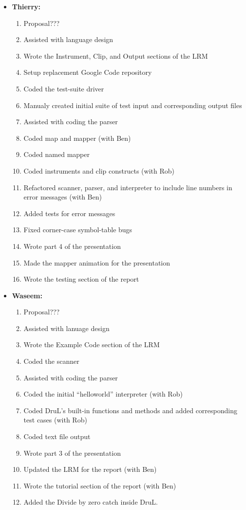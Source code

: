 \begin{itemize}
\item \textbf{Thierry:}
\begin{enumerate}
	\item Proposal???
	\item Assisted with language design
	\item Wrote the Instrument, Clip, and Output sections of the LRM
	\item Setup replacement Google Code repository
	\item Coded the test-suite driver
	\item Manualy created initial suite of test input and corresponding output files
	\item Assisted with coding the parser
	\item Coded map and mapper (with Ben)
	\item Coded named mapper
	\item Coded instruments and clip constructs (with Rob)
	\item Refactored scanner, parser, and interpreter to include line numbers in error messages (with Ben)
	\item Added tests for error messages
	\item Fixed corner-case symbol-table bugs
	\item Wrote part 4 of the presentation
	\item Made the mapper animation for the presentation
	\item Wrote the testing section of the report
\end{enumerate}

\item \textbf{Waseem:}
\begin{enumerate}
	\item Proposal???
	\item Assisted with lanuage design
	\item Wrote the Example Code section of the LRM
	\item Coded the scanner
	\item Assisted with coding the parser
	\item Coded the initial ``helloworld'' interpreter (with Rob)
	\item Coded DruL's built-in functions and methods and added corresponding test cases (with Rob)
	\item Coded text file output
	\item Wrote part 3 of the presentation
	\item Updated the LRM for the report (with Ben)
	\item Wrote the tutorial section of the report (with Ben)
	\item Added the Divide by zero catch inside DruL.
\end{enumerate}

\end{itemize}

